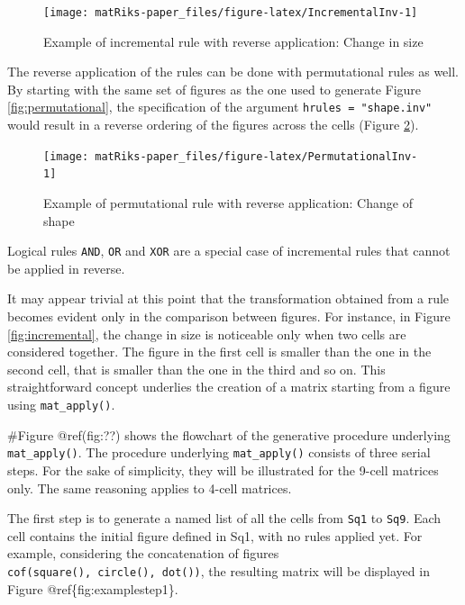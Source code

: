 \begin{figure}

{\centering \texttt{[image: matRiks-paper\_files/figure-latex/IncrementalInv-1]} 

}

\caption{Example of incremental rule with reverse application: Change in size}\label{fig:IncrementalInv}
\end{figure}

The reverse application of the rules can be done with permutational rules as well. By starting with the same set of figures as the one used to generate Figure \ref{fig:permutational}, the specification of the argument \texttt{hrules\ =\ "shape.inv"} would result in a reverse ordering of the figures across the cells (Figure \ref{fig:PermutationalInv}).

\begin{figure}

{\centering \texttt{[image: matRiks-paper\_files/figure-latex/PermutationalInv-1]} 

}

\caption{Example of  permutational rule with reverse application: Change of shape}\label{fig:PermutationalInv}
\end{figure}

Logical rules \texttt{AND}, \texttt{OR} and \texttt{XOR} are a special case of incremental rules that cannot be applied in reverse.

It may appear trivial at this point that the transformation obtained from a rule becomes evident only in the comparison between figures. For instance, in Figure \ref{fig:incremental}, the change in size is noticeable only when two cells are considered together. The figure in the first cell is smaller than the one in the second cell, that is smaller than the one in the third and so on. This straightforward concept underlies the creation of a matrix starting from a figure using \texttt{mat\_apply()}.

\#Figure @ref(fig:??) shows the flowchart of the generative procedure underlying \texttt{mat\_apply()}.
The procedure underlying \texttt{mat\_apply()} consists of three serial steps.
For the sake of simplicity, they will be illustrated for the 9-cell matrices only. The same reasoning applies to 4-cell matrices.

The first step is to generate a named list of all the cells from \texttt{Sq1} to \texttt{Sq9}. Each cell contains the initial figure defined in Sq1, with no rules applied yet. For example, considering the concatenation of figures \texttt{cof(square(),\ circle(),\ dot())}, the resulting matrix will be displayed in Figure @ref\{fig:examplestep1\}.


